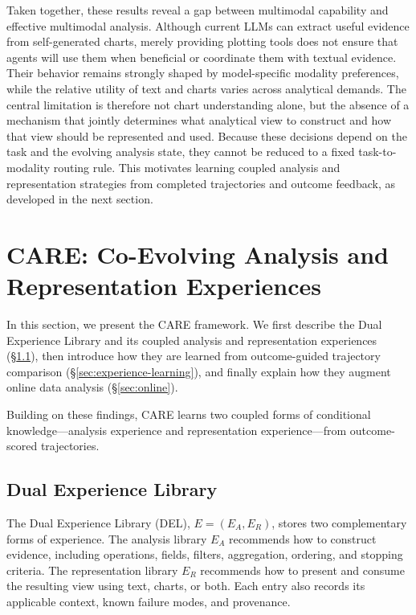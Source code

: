 \documentclass{article}
\newcommand{\method}{\textsc{CARE}}
\begin{document}
Taken together, these results reveal a gap between multimodal capability and effective multimodal analysis. Although current LLMs can extract useful evidence from self-generated charts, merely providing plotting tools does not ensure that agents will use them when beneficial or coordinate them with textual evidence. Their behavior remains strongly shaped by model-specific modality preferences, while the relative utility of text and charts varies across analytical demands. The central limitation is therefore not chart understanding alone, but the absence of a mechanism that jointly determines what analytical view to construct and how that view should be represented and used. Because these decisions depend on the task and the evolving analysis state, they cannot be reduced to a fixed task-to-modality routing rule. This motivates learning coupled analysis and representation strategies from completed trajectories and outcome feedback, as developed in the next section.


\section{\method{}: Co-Evolving Analysis and Representation Experiences}
\label{sec:care}

In this section, we present the \method{} framework.
We first describe the Dual Experience Library and its coupled analysis and representation experiences (\S\ref{sec:del}), then introduce how they are learned from outcome-guided trajectory comparison (\S\ref{sec:experience-learning}), and finally explain how they augment online data analysis (\S\ref{sec:online}).

Building on these findings, \method{} learns two coupled forms of conditional knowledge---analysis experience and representation experience---from outcome-scored trajectories.


\subsection{Dual Experience Library}
\label{sec:del}

The Dual Experience Library (DEL), $E=(E_A,E_R)$, stores two complementary forms of experience.
The analysis library $E_A$ recommends how to construct evidence, including operations, fields, filters, aggregation, ordering, and stopping criteria.
The representation library $E_R$ recommends how to present and consume the resulting view using text, charts, or both.
Each entry also records its applicable context, known failure modes, and provenance.
\end{document}
